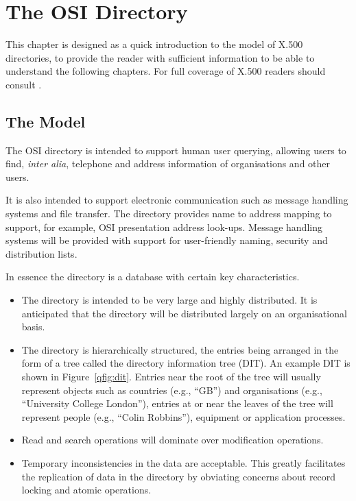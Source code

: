 
\chapter{The OSI Directory}
\label{dir_model}

This chapter is designed as a quick introduction to the model of X.500
directories, to provide the reader with sufficient information to be able to
understand the following chapters.
For full coverage of X.500 readers should consult
\cite{little.black.book}.

\section {The Model}
The OSI directory is intended to support human user querying, allowing
users to find, {\em inter alia}, telephone and address information of
organisations and other users.  

It is also intended to support electronic
communication such as message handling systems and file transfer.
The directory provides name to address mapping to support, for example, OSI
presentation address look-ups. Message handling systems will be provided with 
support for user-friendly naming, security and
distribution lists.


In essence the directory is a database with certain key characteristics.
\begin{itemize}
\item
The directory is intended to be very large and highly distributed. It is
anticipated that the directory will be distributed largely on an
organisational basis.
\item
The directory is hierarchically structured, the entries being arranged in
the form of a tree called the directory information tree (DIT).
An example DIT is shown in Figure~\ref{qfig:dit}. 
Entries near the root of the tree will usually represent
objects such as countries (e.g., ``GB'') and organisations (e.g., ``University 
College London''), entries at or near the leaves
of the tree will represent people (e.g., ``Colin Robbins''), 
equipment or application processes.

\item
Read and search operations will dominate over modification operations.
\item
Temporary inconsistencies in the data are acceptable.  This greatly
facilitates the replication of data in the directory by obviating concerns
about record locking and atomic operations.
\end{itemize}


